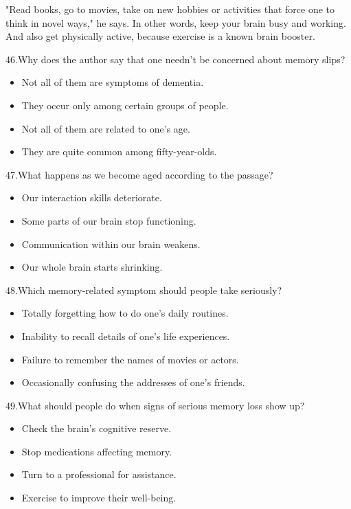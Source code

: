 \documentclass[UTF8,11pt]{ctexart}
\begin{document}
"Read books, go to movies, take on new hobbies or activities that force one to think in novel ways," he says. In other words, keep your brain busy and working. And also get physically active, because exercise is a known brain booster.


46.Why does the author say that one needn't be concerned about memory slips?


\begin{itemize}[leftmargin=2em,itemsep=.2em,topsep=.4em]\item[A.] Not all of them are symptoms of dementia.
\item[B.] They occur only among certain groups of people.
\item[C.] Not all of them are related to one's age.
\item[D.] They are quite common among fifty-year-olds.
\end{itemize}

47.What happens as we become aged according to the passage?


\begin{itemize}[leftmargin=2em,itemsep=.2em,topsep=.4em]\item[A.] Our interaction skills deteriorate.
\item[B.] Some parts of our brain stop functioning.
\item[C.] Communication within our brain weakens.
\item[D.] Our whole brain starts shrinking.
\end{itemize}

48.Which memory-related symptom should people take seriously?


\begin{itemize}[leftmargin=2em,itemsep=.2em,topsep=.4em]\item[A.] Totally forgetting how to do one's daily routines.
\item[B.] Inability to recall details of one's life experiences.
\item[C.] Failure to remember the names of movies or actors.
\item[D.] Occasionally confusing the addresses of one's friends.
\end{itemize}

49.What should people do when signs of serious memory loss show up?


\begin{itemize}[leftmargin=2em,itemsep=.2em,topsep=.4em]\item[A.] Check the brain's cognitive reserve.
\item[B.] Stop medications affecting memory.
\item[C.] Turn to a professional for assistance.
\item[D.] Exercise to improve their well-being.
\end{itemize}
\end{document}
